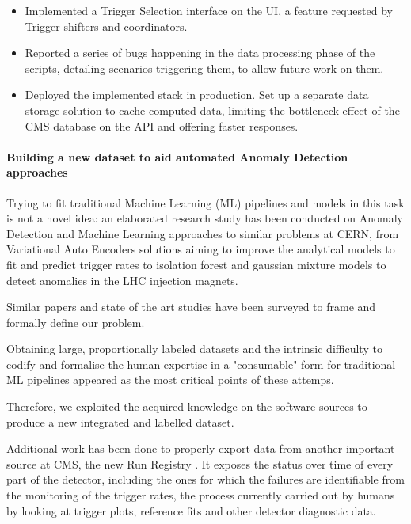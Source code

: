 \documentclass[a4, oneside, 10pt, nobib]{memoir}
\begin{document}
\begin{itemize}
		\item Implemented a Trigger Selection interface on the UI, a feature requested by Trigger shifters and coordinators.
		\item Reported a series of bugs happening in the data processing phase of the scripts, detailing scenarios triggering them, to allow future work on them.
		\item Deployed the implemented stack in production. Set up a separate data storage solution to cache computed data, limiting the bottleneck effect of the CMS database on the API and offering faster responses.

		\end{itemize}


		\paragraph{Building a new dataset to aid automated Anomaly Detection approaches}

		Trying to fit traditional Machine Learning (ML) pipelines and models in this task is not a novel idea: an elaborated research study has been conducted on Anomaly Detection and Machine Learning approaches to similar problems at CERN, from Variational Auto Encoders solutions \cite{adpol-cvae}aiming to improve the analytical models to fit and predict trigger rates to isolation forest and gaussian mixture models \cite{Halilovic:2665985} to detect anomalies in the LHC injection magnets.

		Similar papers and state of the art studies have been surveyed to frame and formally define our problem.

		Obtaining large, proportionally labeled datasets and the intrinsic difficulty to codify and formalise the human expertise in a "consumable" form for traditional ML pipelines appeared as the most critical points of these attemps.

		Therefore, we exploited the acquired knowledge on the software sources to produce a new integrated and labelled dataset.

		Additional work has been done to properly export data from another important source at CMS, the new Run Registry \cite{cms_collaboration_2019_3599323}. It exposes the status over time of every part of the detector, including the ones for which the failures are identifiable from the monitoring of the trigger rates, the process currently carried out by humans by looking at trigger plots, reference fits and other detector diagnostic data.
\end{document}
